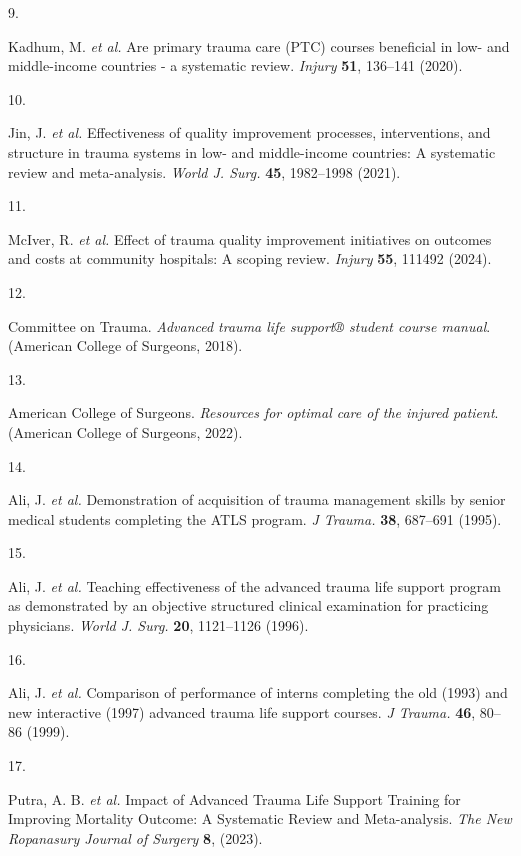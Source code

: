 \documentclass[
]{scrartcl}
\newlength{\cslhangindent}
\newlength{\csllabelwidth}
\newenvironment{CSLReferences}[2] %
 {\begin{list}{}{%
  \setlength{\itemindent}{0pt}
  \setlength{\leftmargin}{0pt}
  \setlength{\parsep}{0pt}
  \ifodd #1
   \setlength{\leftmargin}{\cslhangindent}
   \setlength{\itemindent}{-1\cslhangindent}
  \fi
  \setlength{\itemsep}{#2\baselineskip}}}
 {\end{list}}
\newcommand{\CSLLeftMargin}[1]{\parbox[t]{\csllabelwidth}{\strut#1\strut}}
\newcommand{\CSLRightInline}[1]{\parbox[t]{\linewidth - \csllabelwidth}{\strut#1\strut}}
\begin{document}
\begin{CSLReferences}{0}{0}
\CSLLeftMargin{9. }%
\CSLRightInline{Kadhum, M. \emph{et al.} Are primary trauma care (PTC)
courses beneficial in low- and middle-income countries - a systematic
review. \emph{Injury} \textbf{51}, 136--141 (2020).}

\CSLLeftMargin{10. }%
\CSLRightInline{Jin, J. \emph{et al.} Effectiveness of quality
improvement processes, interventions, and structure in trauma systems in
low- and middle-income countries: A systematic review and meta-analysis.
\emph{World J. Surg.} \textbf{45}, 1982--1998 (2021).}

\CSLLeftMargin{11. }%
\CSLRightInline{McIver, R. \emph{et al.} Effect of trauma quality
improvement initiatives on outcomes and costs at community hospitals:
{A} scoping review. \emph{Injury} \textbf{55}, 111492 (2024).}

\CSLLeftMargin{12. }%
\CSLRightInline{Committee on Trauma. \emph{Advanced trauma life support®
student course manual}. (American College of Surgeons, 2018).}

\CSLLeftMargin{13. }%
\CSLRightInline{American College of Surgeons. \emph{Resources for
optimal care of the injured patient}. ({American College of Surgeons},
2022).}

\CSLLeftMargin{14. }%
\CSLRightInline{Ali, J. \emph{et al.} Demonstration of acquisition of
trauma management skills by senior medical students completing the ATLS
program. \emph{J Trauma.} \textbf{38}, 687--691 (1995).}

\CSLLeftMargin{15. }%
\CSLRightInline{Ali, J. \emph{et al.} Teaching effectiveness of the
advanced trauma life support program as demonstrated by an objective
structured clinical examination for practicing physicians. \emph{World
J. Surg.} \textbf{20}, 1121--1126 (1996).}

\CSLLeftMargin{16. }%
\CSLRightInline{Ali, J. \emph{et al.} Comparison of performance of
interns completing the old (1993) and new interactive (1997) advanced
trauma life support courses. \emph{J Trauma.} \textbf{46}, 80--86
(1999).}

\CSLLeftMargin{17. }%
\CSLRightInline{Putra, A. B. \emph{et al.} Impact of {Advanced} {Trauma}
{Life} {Support} {Training} for {Improving} {Mortality} {Outcome}: {A}
{Systematic} {Review} and {Meta}-analysis. \emph{The New Ropanasury
Journal of Surgery} \textbf{8}, (2023).}


\end{CSLReferences}
\end{document}
